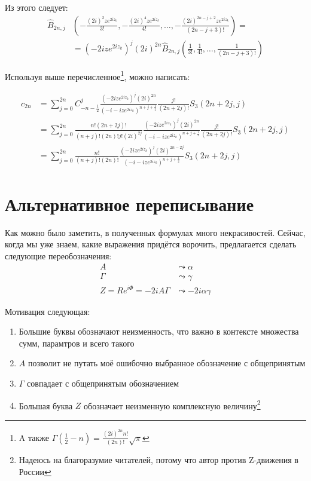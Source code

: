 \documentclass[a4paper, 12pt]{article}
\begin{document}
Из этого следует:
\begin{equation}
\begin{aligned}
    \hat{B}_{2n, j}&\left(-\frac{(2i)^{2}ze^{2iz_k}}{3!}, -\frac{(2i)^{4}ze^{2iz_k}}{4!}, \dots, -\frac{(2i)^{2n-j+2}ze^{2iz_k}}{(2n-j+3)!}\right) = \\
    &= (-2iz e^{2iz_k})^j (2i)^{2n}\hat{B}_{2n, j}\left(\frac{1}{3!}, \frac{1}{4!}, \dots, \frac{1}{(2n-j+3)!}\right)
\end{aligned}
\end{equation}

Используя выше перечисленное\footnote{A также $\Gamma\left(\frac{1}{2}-n\right)= \frac{(2i)^{2n} n!}{(2n)!}\sqrt{\pi}$}, можно написать:

\begin{equation}
\begin{aligned}
    c_{2n} &=
    \sum\limits_{j=0}^{2n} C_{-n-\frac{1}{2}}^j
    \frac{(-2iz e^{2iz_k})^j (2i)^{2n}}{\left(-i - iz e^{2iz_k}\right)^{n+j+\frac{1}{2}}} 
    \frac{j!}{(2n+2j)!}S_{3}(2n+2j, j)\\
    &= \sum\limits_{j=0}^{2n} \frac{n!(2n+2j)!}{(n+j)!(2n)!j! (2i)^{2j}}
    \frac{(-2iz e^{2iz_k})^j (2i)^{2n}}{\left(-i - iz e^{2iz_k}\right)^{n+j+\frac{1}{2}}} 
    \frac{j!}{(2n+2j)!}S_{3}(2n+2j, j)\\
    &= \sum\limits_{j=0}^{2n} \frac{n!}{(n+j)!(2n)!}
    \frac{(-2iz e^{2iz_k})^j (2i)^{2n-2j}}{\left(-i - iz e^{2iz_k}\right)^{n+j+\frac{1}{2}}} S_{3}(2n+2j, j)
\end{aligned}
\end{equation}

\section*{Альтернативное переписывание}
Как можно было заметить, в полученных формулах много некрасивостей. Сейчас, когда мы уже знаем, какие выражения придётся ворочить, предлагается сделать следующие переобозначения:
\begin{equation}
\begin{aligned}
    A &\leadsto \alpha \\
    \Gamma &\leadsto \gamma \\
    Z = R e^{i\Phi}  = -2i A \Gamma&\leadsto -2i\alpha \gamma
\end{aligned}
\end{equation}

Мотивация следующая:
\begin{enumerate}
    \item Большие буквы обозначают неизменность, что важно в контексте множества сумм, парамтров и всего такого
    \item $A$ позволит не путать моё ошибочно выбранное обозначение с общепринятым
    \item $\Gamma$ совпадает с общепринятым обозначением
    \item Большая буква $Z$ обозначает неизменную комплексную величину\footnote{Надеюсь на благоразумие читателей, потому что автор против Z-движения в России}
\end{enumerate}
\end{document}
